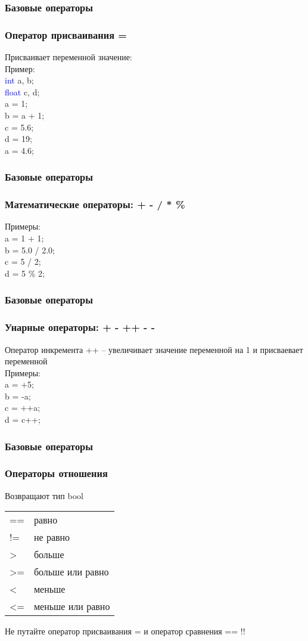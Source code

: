 \documentclass[12pt,pdf,hyperref={unicode}]{beamer}
\begin{document}
\begin{frame}
\frametitle{Базовые операторы}
\frametitle{Оператор присваивания =} 
Присваивает переменной значение:\\
Пример:\\
\quad \textcolor{blue}{int} a, b;\\
\quad \textcolor{blue}{float} c, d;\\
\quad a = 1;\\
\quad b = a + 1;\\
\quad c = 5.6;\\
\quad d = 19;\\
\quad a = 4.6;\\

\end{frame}


\begin{frame}
\frametitle{Базовые операторы}
\frametitle{Математические операторы: + - / * \%} 
Примеры:\\
\quad a = 1 + 1; \\
\quad b = 5.0 / 2.0;\\
\quad c = 5 / 2;\\
\quad d = 5 \% 2;\\
\end{frame}

\begin{frame}
\frametitle{Базовые операторы}
\frametitle{Унарные операторы: + - ++ - -}
Оператор инкремента ++ -- увеличивает значение переменной на 1 и присваевает переменной  \\
Примеры:\\
\quad a = +5; \\
\quad b = -a;\\
\quad c = ++a;\\
\quad d = c++;\\
\end{frame}







\iffalse

\begin{frame}
\frametitle{Базовые операторы}
\frametitle{Операторы отношения}
Возвращают тип bool
\begin{center}
\begin{tabular}{ l l}
  == & равно \\
  != & не равно \\
  > & больше \\
  >= & больше или равно \\
  < & меньше \\
  <= & меньше или равно \\
\end{tabular}
\end{center}

Не путайте оператор присваивания = и оператор сравнения == !! 
\end{frame}
\end{document}
